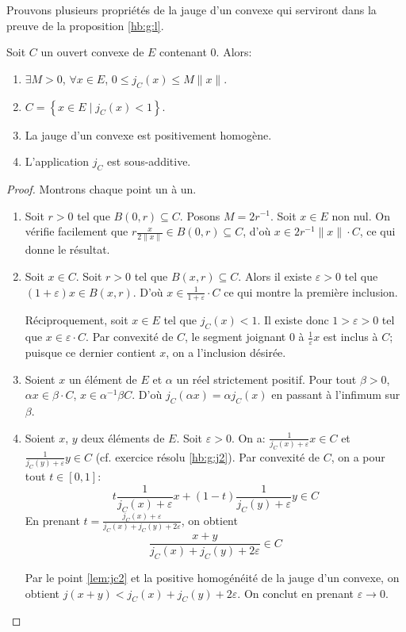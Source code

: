 Prouvons plusieurs propriétés de la jauge d'un convexe qui serviront
dans la preuve de la proposition \ref{hb:g:l}.

\begin{lem} \label{lem:jc}
  Soit $C$ un ouvert convexe de $E$ contenant 0. Alors:
  \begin{enumerate}
  \item $\exists M> 0$, $\forall x\in E$, $0\leq j_C(x)\leq M\|x\|$.
    \label{lem:jc1}
  \item $C = \left\{ x\in E \mid j_C(x)<1\right\}$. \label{lem:jc2}
  \item La jauge d'un convexe est positivement homogène. \label{lem:jc3}
  \item L'application $j_C$ est sous-additive. \label{lem:jc4}
  \end{enumerate}
\end{lem}

\begin{proof}
  Montrons chaque point un à un.
  \begin{enumerate}
  \item Soit $r>0$ tel que $B(0, r)\subseteq C$. Posons
    $M = 2r^{-1}$. Soit $x\in E$ non nul. On vérifie facilement
    que $r\frac{x}{2\|x\|}\in B(0, r)\subseteq C$, d'où $x \in
    2r^{-1}\|x\|\cdot C$, ce qui donne le résultat.
  \item Soit $x\in C$. Soit $r> 0$ tel que $B(x, r)\subseteq C$.
    Alors il existe $\varepsilon >0$ tel que $(1+\varepsilon)x\in
    B(x, r)$. D'où $x\in \frac{1}{1+\varepsilon}\cdot C$ ce qui
    montre la première inclusion.

    Réciproquement, soit $x\in E$ tel que $j_C(x)<1$. Il existe
    donc $1 > \varepsilon > 0$ tel que $x\in \varepsilon \cdot C$.
    Par convexité de $C$, le segment joignant $0$ à
    $\frac{1}{\varepsilon}x$ est inclus à $C$; puisque
    ce dernier contient $x$, on a l'inclusion désirée.
  \item Soient $x$ un élément de $E$ et $\alpha$ un réel strictement
    positif. Pour tout $\beta > 0$, $\alpha x\in \beta\cdot C$, \ssi{}
    $x\in \alpha^{-1}\beta C$. D'où $j_C(\alpha x) = \alpha j_C(x)$ en
    passant à l'infimum sur $\beta$.
  \item Soient $x$, $y$  deux éléments de $E$. Soit
    $\varepsilon>0$. On a:%
    $\frac{1}{j_C(x)+\varepsilon}x\in C$ et
    $\frac{1}{j_C(y)+\varepsilon}y\in C$ (cf. exercice résolu \ref{hb:g:j2}).
    Par convexité de $C$, on a pour tout $t\in [0, 1]$:
    $$t\frac{1}{j_C(x)+\varepsilon}x +
    (1-t)\frac{1}{j_C(y)+\varepsilon}y\in C$$
    En prenant $\displaystyle{t = \frac{j_C(x)+\varepsilon}
      {j_C(x) +j_C(y)+2\varepsilon}}$, on obtient
    $$\frac{x+y}{j_C(x) +j_C(y)+2\varepsilon}\in C $$

    Par le point \ref{lem:jc2} et la positive homogénéité de la jauge d'un convexe,
    on obtient $j(x + y) < j_C(x)+j_C(y)+2\varepsilon$. On conclut
    en prenant $\varepsilon \to 0$.
  \end{enumerate}
\end{proof}

